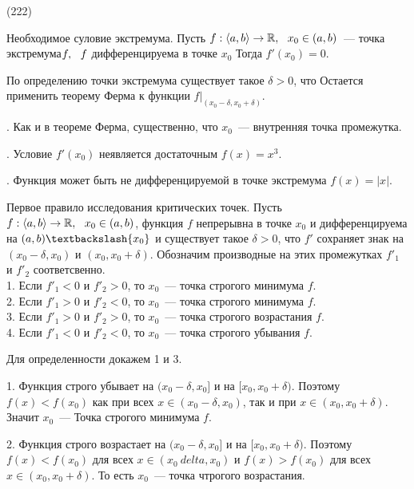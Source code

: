 (222)

\T \q Необходимое суловие экстремума. Пусть $f: \langle a, b \rangle \to \mathbb{R},\ \  x_0 \in (a, b)$~--- точка экстремума$f,\ \  f$ дифференцируема в точке $x_0$ Тогда $f'(x_0) = 0$.

\D По определению точки экстремума существует такое $\delta > 0$, что  Остается применить теорему Ферма к функции $f|_{(x_0 - \delta, x_0 + \delta)}.$

. Как и в теореме Ферма, существенно, что $x_0$~--- внутренняя точка промежутка.

. Условие $f'(x_0)$ неявляется достаточным $f(x) = x^3$.

. Функция может быть не дифференцируемой в точке экстремума $f(x) = |x|$.

\T \q Первое правило исследования критических точек. Пусть $f: \langle a, b \rangle \to \mathbb{R},\ \  x_0 \in (a, b)$, функция $f$ непрерывна в точке $x_0$ и дифференцируема на $(a, b) \bsl \{x_0\}$ и существует такое $\delta > 0$, что $f'$ сохраняет знак на $(x_0 - \delta, x_0)$ и $(x_0, x_0 + \delta)$. Обозначим производные на этих промежутках $f'_1$ и $f'_2$ соответсвенно.\\
1. Если $f'_1 < 0$ и $f'_2 > 0$, то $x_0$~--- точка строгого минимума $f$.\\
2. Если $f'_1 > 0$ и $f'_2 < 0$, то $x_0$~--- точка строгого минимума $f$.\\
3. Если $f'_1 > 0$ и $f'_2 > 0$, то $x_0$~--- точка строгого возрастания $f$.\\
4. Если $f'_1 < 0$ и $f'_2 < 0$, то $x_0$~--- точка строгого убывания $f$.

\D Для определенности докажем 1 и 3.

1. Функция строго убывает на $(x_0 - \delta, x_0]$ и на $[x_0, x_0 + \delta)$. Поэтому $f(x) < f(x_0)$ как при всех $x\in (x_0 - \delta, x_0)$, так и при $x \in (x_0, x_0 + \delta)$. Значит $x_0$~--- Точка строгого минимума $f$.

2. Функция строго возрастает на $(x_0 - \delta, x_0]$ и на $[x_0, x_0 + \delta)$. Поэтому $f(x) < f(x_0)$ для всех $x \in (x_0 \ delta, x_0)$ и $f(x) > f(x_0)$ для всех $x \in (x_0, x_0 + \delta)$. То есть $x_0$~--- точка чтрогого возрастания.